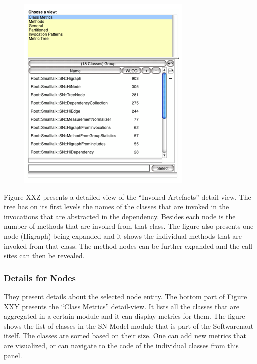 \documentclass[preprint,12pt]{elsarticle}
\begin{document}
\begin{figure}[h]
\begin{center}
\includegraphics[width=0.5\linewidth]{images/DetailForNode.png}
\caption{}
\label{}
\end{center}
\end{figure}
Figure XXZ presents a detailed view of the “Invoked Artefacts” detail view. The tree has on its first levels the names of the classes that are invoked in the invocations that are abstracted in the dependency. Besides each node is the number of methods that are invoked from that class. The figure also presents one node (Higraph) being expanded and it shows the individual methods that are invoked from that class. The method nodes can be further expanded and the call sites can then be revealed. 


\subsubsection {Details for Nodes}

They present details about the selected node entity. The bottom part of Figure XXY presents the “Class Metrics” detail-view. It lists all the classes that are aggregated in a certain module and it can display metrics for them. The figure shows the list of classes in the SN-Model module that is part of the Softwarenaut itself. The classes are sorted based on their size. One can add new metrics that are visualized, or can navigate to the code of the individual classes from this panel.
\end{document}
